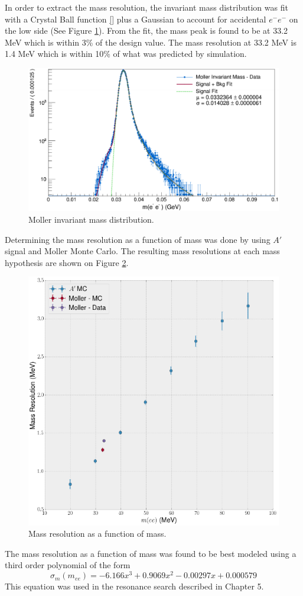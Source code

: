In order to extract the mass resolution, the invariant mass distribution was 
fit with a Crystal Ball function \ref{} plus a Gaussian to account for accidental 
$e^-e^-$ on the low side (See Figure \ref{fig:moller_mass}).  From the 
fit, the mass peak is found to be at 33.2 MeV which is within 3\% of the design
value.  The mass resolution at 33.2 MeV is 1.4 MeV which is within 10\% of what
was predicted by simulation.
\begin{figure}[h!t]
    \centering
    \includegraphics[width=\textwidth]{images/moller_invariant_mass.png}
    \caption{Moller invariant mass distribution.}
    \label{fig:moller_mass}
\end{figure}

Determining the mass resolution as a function of mass was done by using $A'$ 
signal and Moller Monte Carlo. The resulting mass resolutions at each mass 
hypothesis are shown on Figure \ref{fig:mass_resolution}. 
\begin{figure}[h!t]
    \centering
    \includegraphics[width=.8\textwidth]{images/invariant_mass_curve.png}
    \caption{Mass resolution as a function of mass.}
    \label{fig:mass_resolution}
\end{figure}
The mass resolution as a function of mass was found to be best modeled using
a third order polynomial of the form
\begin{equation}
    \sigma_{m}(m_{ee}) = -6.166 x^3 + 0.9069 x^2 - 0.00297 x + 0.000579
\end{equation}
This equation was used in the resonance search described in Chapter 5. 

